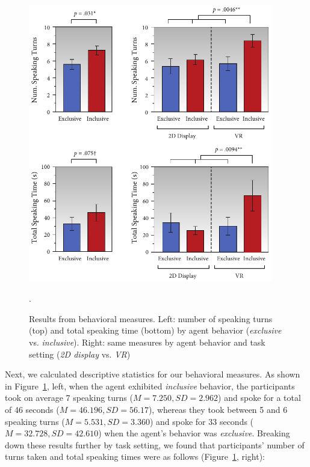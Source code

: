 \begin{figure}
\centering
\includegraphics[width=0.95\textwidth]{conversationalrolegaze/Figures/ResultsBehavioral.pdf}
\caption{Results from behavioral measures. Left: number of speaking turns (top) and total speaking time (bottom) by agent behavior (\emph{exclusive} vs. \emph{inclusive}). Right: same measures by agent behavior and task setting (\emph{2D display} vs. \emph{VR})}.
\label{fig:GazeFootingResultsBehavioral}
\end{figure}

Next, we calculated descriptive statistics for our behavioral measures. As shown in Figure~\ref{fig:GazeFootingResultsBehavioral}, left, when the agent exhibited \emph{inclusive} behavior, the participants took on average 7 speaking turns ($M = 7.250, SD = 2.962$) and spoke for a total of 46 seconds ($M = 46.196, SD = 56.17$), whereas they took between 5 and 6 speaking turns ($M = 5.531, SD = 3.360$) and spoke for 33 seconds ($M = 32.728, SD = 42.610$) when the agent's behavior was \emph{exclusive}. Breaking down these results further by task setting, we found that participants' number of turns taken and total speaking times were as follows (Figure~\ref{fig:GazeFootingResultsBehavioral}, right):

